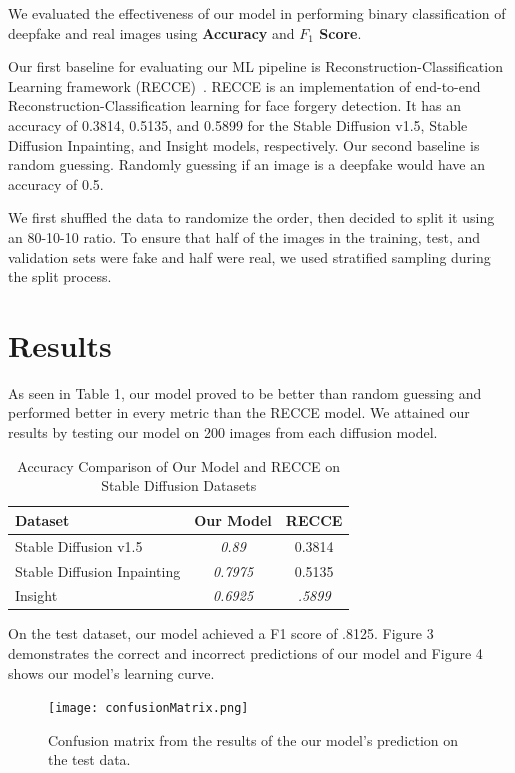 \documentclass[10pt]{article}
\begin{document}
\quad We evaluated the effectiveness of our model in performing binary classification of deepfake and real images using \textbf{Accuracy} and \textbf{$F_{1}$ Score}. 

Our first baseline for evaluating our ML pipeline is Reconstruction-Classification Learning framework (RECCE)~\cite{Cao_2022_CVPR}. RECCE is an implementation of end-to-end Reconstruction-Classification learning for face forgery detection. It has an accuracy of 0.3814, 0.5135, and 0.5899 for the Stable Diffusion v1.5, Stable Diffusion Inpainting, and Insight models, respectively. 
Our second baseline is random guessing. Randomly guessing if an image is a deepfake would have an accuracy of 0.5.

We first shuffled the data to randomize the order, then decided to split it using an 80-10-10 ratio. To ensure that half of the images in the training, test, and validation sets were fake and half were real, we used stratified sampling during the split process.

 




\section{Results}
As seen in Table 1, our model proved to be better than random guessing and performed better in every metric than the RECCE model. We attained our results by testing our model on 200 images from each diffusion model. 

\begin{table}[h]
\centering
\begin{tabular}{|l|c|c|}
\hline
\textbf{Dataset}                & \textbf{Our Model}& \textbf{RECCE }\\ \hline
Stable Diffusion v1.5           & \textit{0.89}& 0.3814             \\ \hline
Stable Diffusion Inpainting     & \textit{0.7975}& 0.5135             \\ \hline
Insight& \textit{0.6925}& \textit{.5899}\\ \hline
\end{tabular}
\caption{Accuracy Comparison of Our Model and RECCE on Stable Diffusion Datasets}
\label{tab:accuracy_comparison}
\end{table}
On the test dataset, our model achieved a F1 score of .8125. Figure 3 demonstrates the correct and incorrect predictions of our model and Figure 4 shows our model's learning curve.
\begin{figure}[htb!]
    \centering
    \texttt{[image: confusionMatrix.png]}
    \caption{Confusion matrix from the results of the our model's prediction on the test data.}
    \label{fig:fig3}
\end{figure}
\end{document}
